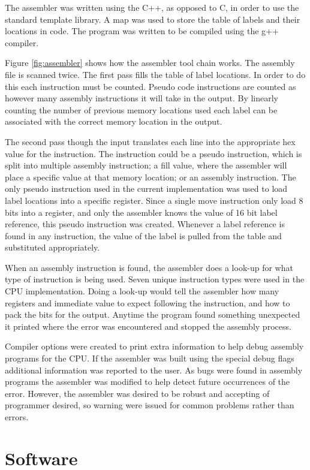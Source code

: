 \documentclass{article}
\begin{document}
The assembler was written using the C++, as opposed to C, in order to use the standard template library.  A map was used to store the table of labels and their locations in code.  The program was written to be compiled using the g++ compiler.

Figure \ref{fig:assembler} shows how the assembler tool chain works.  The assembly file is scanned twice.  The first pass fills the table of label locations.  In order to do this each instruction must be counted.  Pseudo code instructions are counted as however many assembly instructions it will take in the output.  By linearly counting the number of previous memory locations used each label can be associated with the correct memory location in the output.

The second pass though the input translates each line into the appropriate hex value for the instruction.  The instruction could be a pseudo instruction, which is split into multiple assembly instruction; a fill value, where the assembler will place a specific value at that memory location; or an assembly instruction.  The only pseudo instruction used in the current implementation was used to load label locations into a specific register.  Since a single move instruction only load 8 bits into a register, and only the assembler knows the value of 16 bit label reference, this pseudo instruction was created.  Whenever a label reference is found in any instruction, the value of the label is pulled from the table and substituted appropriately.

When an assembly instruction is found, the assembler does a look-up for what type of instruction is being used.  Seven unique instruction types were used in the CPU implementation.  Doing a look-up would tell the assembler how many registers and immediate value to expect following the instruction, and how to pack the bits for the output.  Anytime the program found something unexpected it printed where the error was encountered and stopped the assembly process.  

Compiler options were created to print extra information to help debug assembly programs for the CPU.  If the assembler was built using the special debug flags additional information was reported to the user.  As bugs were found in assembly programs the assembler was modified to help detect future occurrences of the error.  However, the assembler was desired to be robust and accepting of programmer desired, so warning were issued for common problems rather than errors.

\section{Software}
\end{document}
